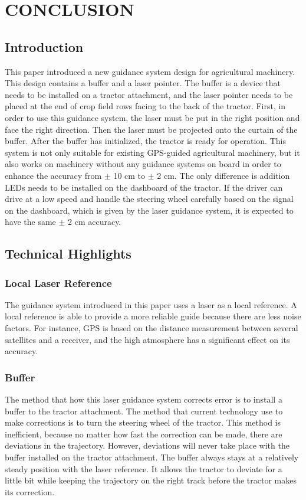 \chapter{CONCLUSION}

\section{Introduction}
This paper introduced a new guidance system design for agricultural machinery. This design contains a buffer and a laser pointer. The buffer is a device that needs to be installed on a tractor attachment, and the laser pointer needs to be placed at the end of crop field rows facing to the back of the tractor. First, in order to use this guidance system, the laser must be put in the right position and face the right direction. Then the laser must be projected onto the curtain of the buffer. After the buffer has initialized, the tractor is ready for operation. This system is not only suitable for existing GPS-guided agricultural machinery, but it also works on machinery without any guidance systems on board in order to enhance the accuracy from $\pm$ 10 cm to $\pm$ 2 cm. The only difference is addition LEDs needs to be installed on the dashboard of the tractor. If the driver can drive at a low speed and handle the steering wheel carefully based on the signal on the dashboard, which is given by the laser guidance system, it is expected to have the same $\pm$ 2 cm accuracy. 


\section{Technical Highlights}

\subsection{Local Laser Reference}
The guidance system introduced in this paper uses a laser as a local reference. A local reference is able to provide a more reliable guide because there are less noise factors. For instance, GPS is based on the distance measurement between several satellites and a receiver, and the high atmosphere has a significant effect on its accuracy. 

\subsection{Buffer}
The method that how this laser guidance system corrects error is to install a buffer to the tractor attachment. The method that current technology use to make corrections is to turn the steering wheel of the tractor. This method is inefficient, because no matter how fast the correction can be made, there are deviations in the trajectory. However, deviations will never take place with the buffer installed on the tractor attachment. The buffer always stays at a relatively steady position with the laser reference. It allows the tractor to deviate for a little bit while keeping the trajectory on the right track before the tractor makes its correction.

